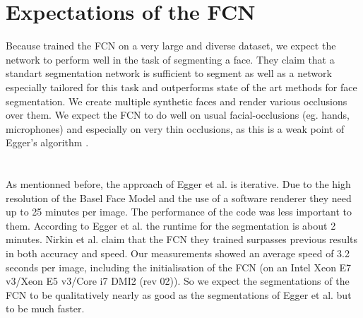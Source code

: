 \section{Expectations of the FCN}
Because \cite{nirkin2018_faceswap} trained the FCN on a very large and diverse dataset, we expect the network to perform well in the task of segmenting a face. They claim that a standart segmentation network is sufficient to segment as well as a network especially tailored for this task and outperforms state of the art methods for face segmentation. We create multiple synthetic faces and render various occlusions over them. We expect the FCN to do well on usual facial-occlusions (eg. hands, microphones) and especially on very thin occlusions, as this is a weak point of Egger's algorithm \cite{egger_paper}.\\
\\
\\
As mentionned before, the approach of Egger et al. is iterative. Due to the high resolution of the Basel Face Model and the use of a software renderer they need up to 25 minutes per image. The performance of the code was less important to them.  According to Egger et al. the runtime for the segmentation is about 2 minutes. Nirkin et al. claim that the FCN they trained surpasses previous results in both accuracy and speed. Our measurements showed an average speed of 3.2 seconds per image, including the initialisation of the FCN (on an Intel Xeon E7 v3/Xeon E5 v3/Core i7 DMI2 (rev 02)). So we expect the segmentations of the FCN to be qualitatively nearly as good as the segmentations of Egger et al. but to be much faster.